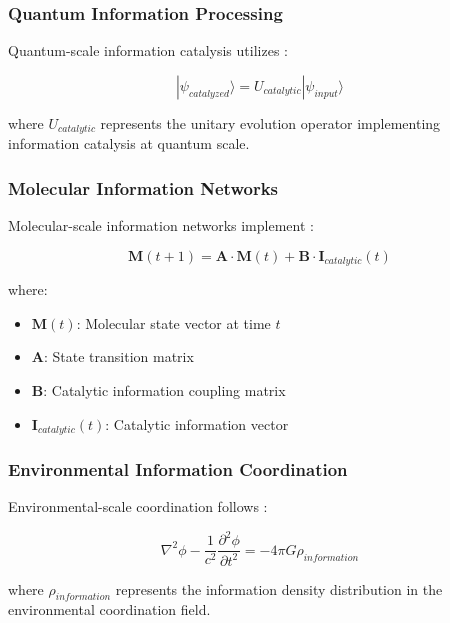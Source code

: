 \subsubsection{Quantum Information Processing}

Quantum-scale information catalysis utilizes \cite{nielsen2010quantum}:

\begin{equation}
|\psi_{catalyzed}\rangle = U_{catalytic} |\psi_{input}\rangle
\end{equation}

where $U_{catalytic}$ represents the unitary evolution operator implementing information catalysis at quantum scale.

\subsubsection{Molecular Information Networks}

Molecular-scale information networks implement \cite{erdi2005mathematical}:

\begin{equation}
\mathbf{M}(t+1) = \mathbf{A} \cdot \mathbf{M}(t) + \mathbf{B} \cdot \mathbf{I}_{catalytic}(t)
\end{equation}

where:
\begin{itemize}
\item $\mathbf{M}(t)$: Molecular state vector at time $t$
\item $\mathbf{A}$: State transition matrix
\item $\mathbf{B}$: Catalytic information coupling matrix
\item $\mathbf{I}_{catalytic}(t)$: Catalytic information vector
\end{itemize}

\subsubsection{Environmental Information Coordination}

Environmental-scale coordination follows \cite{jackson1998classical}:

\begin{equation}
\nabla^2 \phi - \frac{1}{c^2} \frac{\partial^2 \phi}{\partial t^2} = -4\pi G \rho_{information}
\end{equation}

where $\rho_{information}$ represents the information density distribution in the environmental coordination field.

